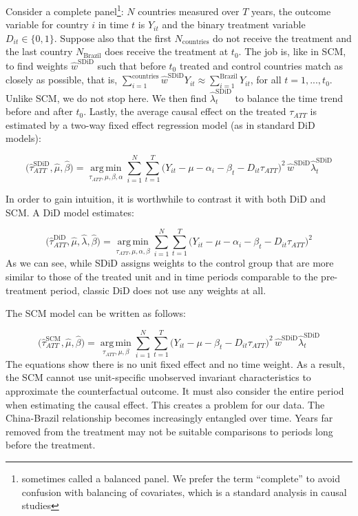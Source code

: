 \documentclass[
  12pt,
]{article}
\begin{document}
Consider a complete panel\footnote{sometimes called a balanced panel. We
  prefer the term ``complete'' to avoid confusion with balancing of
  covariates, which is a standard analysis in causal studies}: \(N\)
countries measured over \(T\) years, the outcome variable for country
\(i\) in time \(t\) is \(Y_{it}\) and the binary treatment variable
\(D_{it} \in \{0,1\}\). Suppose also that the first
\(N_{\text{countries}}\) do not receive the treatment and the last
country \(N_{\text{Brazil}}\) does receive the treatment at \(t_0\). The
job is, like in SCM, to find weights \(\hat{w}^{\text{SDiD}}\) such that
before \(t_0\) treated and control countries match as closely as
possible, that is,
\(\sum_{i=1}^{\text{countries}} \hat{w}^{\text{SDiD}}Y_{it} \approx \sum_{i=1}^{\text{Brazil}} Y_{it}\),
for all \(t = 1, ..., t_0\). Unlike SCM, we do not stop here. We then
find \(\hat{\lambda}^{\text{SDiD}}_t\) to balance the time trend before
and after \(t_0\). Lastly, the average causal effect on the treated
\(\tau_{ATT}\) is estimated by a two-way fixed effect regression model
(as in standard DiD models):

\[
\bigl(\hat{\tau}_{ATT}^{\text{SDiD}}, \hat{\mu}, \hat{\beta} \bigr)
=
\operatorname*{arg\,min}_{\tau_{ATT},\mu,\beta, \alpha}
\sum_{i=1}^{N}\sum_{t=1}^{T}
\bigl(Y_{it}- \mu- \alpha_i - \beta_t-D_{it}\tau_{ATT}\bigr)^2\,
\hat{w}^{\text{SDiD}} \hat{\lambda}^{\text{SDiD}}_t
\]

In order to gain intuition, it is worthwhile to contrast it with both
DiD and SCM. A DiD model estimates:

\[
\bigl(\hat{\tau}_{ATT}^{\text{DiD}}, \hat{\mu}, \hat{\lambda}, \hat{\beta}\bigr)
=
\operatorname*{arg\,min}_{\tau_{ATT},\mu, \alpha, \beta}
\sum_{i=1}^{N}\sum_{t=1}^{T}
\bigl(Y_{it}-\mu-\alpha_i -\beta_t-D_{it}\tau_{ATT}\bigr)^2
\] As we can see, while SDiD assigns weights to the control group that
are more similar to those of the treated unit and in time periods
comparable to the pre-treatment period, classic DiD does not use any
weights at all.

The SCM model can be written as follows:

\[
\bigl(\hat{\tau}_{ATT}^{\text{SCM}}, \hat{\mu}, \hat{\beta}\bigr)
=
\operatorname*{arg\,min}_{\tau_{ATT}, \mu, \beta}
\sum_{i=1}^{N}\sum_{t=1}^{T}
\bigl(Y_{it}-\mu-\beta_t-D_{it}\tau_{ATT}\bigr)^2\,
\hat{w}^{\text{SDiD}} \hat{\lambda}^{\text{SDiD}}_t
\] The equations show there is no unit fixed effect and no time weight.
As a result, the SCM cannot use unit-specific unobserved invariant
characteristics to approximate the counterfactual outcome. It must also
consider the entire period when estimating the causal effect. This
creates a problem for our data. The China-Brazil relationship becomes
increasingly entangled over time. Years far removed from the treatment
may not be suitable comparisons to periods long before the treatment.
\end{document}
